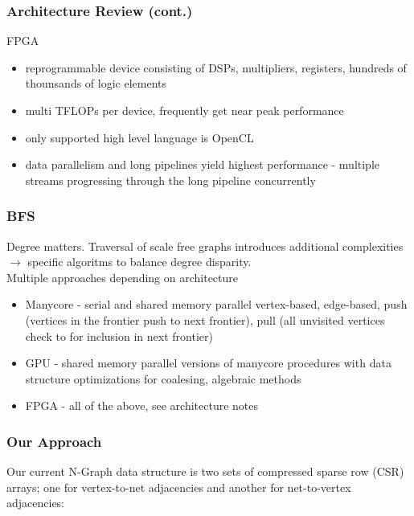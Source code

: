\documentclass{beamer}
\begin{document}
\begin{frame}
  \frametitle{Architecture Review (cont.)}
  FPGA
  \begin{itemize}
    \item reprogrammable device consisting of DSPs, multipliers, registers, hundreds of
      thounsands of logic elements
    \item multi TFLOPs per device, frequently get near peak performance
    \item only supported high level language is OpenCL
    \item data parallelism and long pipelines yield highest performance - multiple streams
      progressing through the long pipeline concurrently
  \end{itemize}
\end{frame}

\begin{frame}
  \frametitle{BFS}
  Degree matters.  Traversal of scale free graphs introduces additional
  complexities $\rightarrow$ specific algoritms to balance degree disparity. \\
  Multiple approaches depending on architecture
  \begin{itemize}
    \item Manycore - serial and shared memory parallel vertex-based, edge-based, push (vertices
      in the frontier push to next frontier), pull (all unvisited vertices check
      to for inclusion in next frontier)
    \item GPU - shared memory parallel versions of manycore procedures with data structure
      optimizations for coalesing, algebraic methods
    \item FPGA - all of the above, see architecture notes
  \end{itemize}
\end{frame}

\begin{frame}
  \frametitle{Our Approach}
  Our current N-Graph data structure is two sets of compressed sparse row (CSR)
  arrays; one for vertex-to-net adjacencies and another for net-to-vertex
  adjacencies:
\end{frame}
\end{document}
